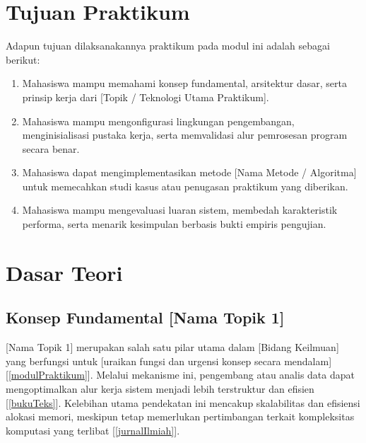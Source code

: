 \documentclass[a4paper,oneside,11pt]{book}
\begin{document}
\chapter{Tujuan Praktikum}
\label{chap:tujuanpraktikum}

Adapun tujuan dilaksanakannya praktikum pada modul ini adalah sebagai berikut:
\begin{enumerate}
    \item Mahasiswa mampu memahami konsep fundamental, arsitektur dasar, serta prinsip kerja dari [Topik / Teknologi Utama Praktikum].
    \item Mahasiswa mampu mengonfigurasi lingkungan pengembangan, menginisialisasi pustaka kerja, serta memvalidasi alur pemrosesan program secara benar.
    \item Mahasiswa dapat mengimplementasikan metode [Nama Metode / Algoritma] untuk memecahkan studi kasus atau penugasan praktikum yang diberikan.
    \item Mahasiswa mampu mengevaluasi luaran sistem, membedah karakteristik performa, serta menarik kesimpulan berbasis bukti empiris pengujian.
\end{enumerate}

\chapter{Dasar Teori}
\label{chap:dasarteori}

\section{Konsep Fundamental [Nama Topik 1]}
[Nama Topik 1] merupakan salah satu pilar utama dalam [Bidang Keilmuan] yang berfungsi untuk [uraikan fungsi dan urgensi konsep secara mendalam] [\ref{modulPraktikum}]. Melalui mekanisme ini, pengembang atau analis data dapat mengoptimalkan alur kerja sistem menjadi lebih terstruktur dan efisien [\ref{bukuTeks}]. Kelebihan utama pendekatan ini mencakup skalabilitas dan efisiensi alokasi memori, meskipun tetap memerlukan pertimbangan terkait kompleksitas komputasi yang terlibat [\ref{jurnalIlmiah}].
\end{document}
